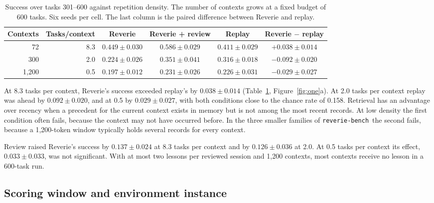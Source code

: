 \documentclass{article}
\newcommand{\bench}{\texttt{reverie-bench}}
\begin{document}
\begin{table}[t]
\centering
\caption{Success over tasks 301--600 against repetition density. The number of
contexts grows at a fixed budget of 600 tasks. Six seeds per cell. The last column is
the paired difference between Reverie and replay.}
\label{tab:density}
\small
\begin{tabular}{rrcccc}
\toprule
Contexts & Tasks/context & Reverie & Reverie + review & Replay & Reverie $-$ replay \\
\midrule
72 & 8.3 & $0.449 \pm 0.030$ & $0.586 \pm 0.029$ & $0.411 \pm 0.029$ & $+0.038 \pm 0.014$ \\
300 & 2.0 & $0.224 \pm 0.026$ & $0.351 \pm 0.041$ & $0.316 \pm 0.018$ & $-0.092 \pm 0.020$ \\
1{,}200 & 0.5 & $0.197 \pm 0.012$ & $0.231 \pm 0.026$ & $0.226 \pm 0.031$ & $-0.029 \pm 0.027$ \\
\bottomrule
\end{tabular}
\end{table}

At 8.3 tasks per context, Reverie's success exceeded replay's by $0.038 \pm 0.014$
(Table~\ref{tab:density}, Figure~\ref{fig:one}a). At 2.0 tasks per context replay was
ahead by $0.092 \pm 0.020$, and at 0.5 by $0.029 \pm 0.027$, with both conditions close
to the chance rate of 0.158. Retrieval has an advantage over recency when a precedent
for the current context exists in memory but is not among the most recent records. At
low density the first condition often fails, because the context may not have occurred
before. In the three smaller families of \bench\ the second fails, because a 1,200-token
window typically holds several records for every context.

Review raised Reverie's success by $0.137 \pm 0.024$ at 8.3 tasks per context and by
$0.126 \pm 0.036$ at 2.0. At 0.5 tasks per context its effect, $0.033 \pm 0.033$, was not
significant. With at most two lessons per reviewed session and 1,200 contexts, most
contexts receive no lesson in a 600-task run.

\subsection{Scoring window and environment instance}
\label{sec:protocol}
\end{document}
